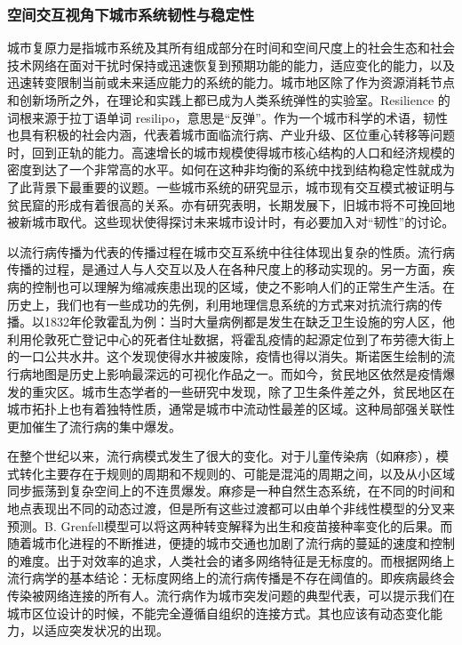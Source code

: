 \subsubsection{空间交互视角下城市系统韧性与稳定性}

城市复原力是指城市系统及其所有组成部分在时间和空间尺度上的社会生态和社会技术网络在面对干扰时保持或迅速恢复到预期功能的能力，适应变化的能力，以及迅速转变限制当前或未来适应能力的系统的能力\cite{meerow2016defining}。城市地区除了作为资源消耗节点和创新场所之外，在理论和实践上都已成为人类系统弹性的实验室\cite{meerow2016defining}。Resilience 的词根来源于拉丁语单词 resilipo，意思是“反弹”。作为一个城市科学的术语，韧性也具有积极的社会内涵，代表着城市面临流行病、产业升级、区位重心转移等问题时，回到正轨的能力\cite{mcevoy2013resilience, o2013deconstructing}。高速增长的城市规模使得城市核心结构的人口和经济规模的密度到达了一个非常高的水平。如何在这种非均衡的系统中找到结构稳定性就成为了此背景下最重要的议题。一些城市系统的研究显示，城市现有交互模式被证明与贫民窟的形成有着很高的关系\cite{brelsford2018toward}。亦有研究表明，长期发展下，旧城市将不可挽回地被新城市取代\cite{fujita1997structural, cottineau2017diverse}。这些现状使得探讨未来城市设计时，有必要加入对“韧性”的讨论。

以流行病传播为代表的传播过程在城市交互系统中往往体现出复杂的性质。流行病传播的过程，是通过人与人交互以及人在各种尺度上的移动实现的\cite{belik2011natural}。另一方面，疾病的控制也可以理解为缩减疾患出现的区域，使之不影响人们的正常生产生活。在历史上，我们也有一些成功的先例，利用地理信息系统的方式来对抗流行病的传播。以1832年伦敦霍乱为例：当时大量病例都是发生在缺乏卫生设施的穷人区，他利用伦敦死亡登记中心的死者住址数据，将霍乱疫情的起源定位到了布劳德大街上的一口公共水井。这个发现使得水井被废除，疫情也得以消失。斯诺医生绘制的流行病地图是历史上影响最深远的可视化作品之一。而如今，贫民地区依然是疫情爆发的重灾区\cite{sahasranaman2021spread}。城市生态学者的一些研究中发现，除了卫生条件差之外，贫民地区在城市拓扑上也有着独特性质，通常是城市中流动性最差的区域\cite{brelsford2018toward}。这种局部强关联性更加催生了流行病的集中爆发。

在整个世纪以来，流行病模式发生了很大的变化。对于儿童传染病（如麻疹），模式转化主要存在于规则的周期和不规则的、可能是混沌的周期之间，以及从小区域同步振荡到复杂空间上的不连贯爆发。麻疹是一种自然生态系统，在不同的时间和地点表现出不同的动态过渡，但是所有这些过渡都可以由单个非线性模型的分叉来预测。B. Grenfell模型\cite{earn2000a}可以将这两种转变解释为出生和疫苗接种率变化的后果。而随着城市化进程的不断推进，便捷的城市交通也加剧了流行病的蔓延的速度和控制的难度。出于对效率的追求，人类社会的诸多网络特征是无标度的。而根据网络上流行病学的基本结论：无标度网络上的流行病传播是不存在阈值的。即疾病最终会传染被网络连接的所有人\cite{eguiluz2002epidemic, plucinski2013clusters}。流行病作为城市突发问题的典型代表，可以提示我们在城市区位设计的时候，不能完全遵循自组织的连接方式。其也应该有动态变化能力，以适应突发状况的出现。

